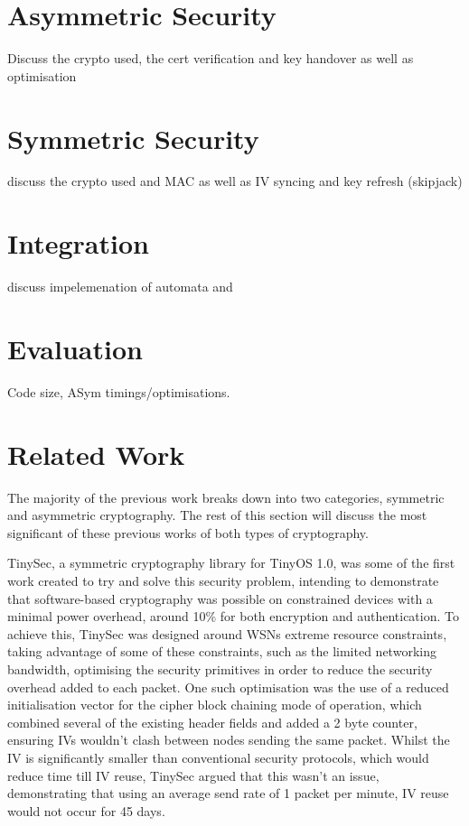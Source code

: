 \documentclass[conference]{./sty/IEEEtran}
\begin{document}
\section{Asymmetric Security} %
\label{sec:asymmetric_security}
Discuss the crypto used, the cert verification and key handover as well as optimisation

\section{Symmetric Security} %
\label{sec:symmetric_security}
discuss the crypto used and MAC
as well as IV syncing and key refresh (skipjack)
\section{Integration} %
\label{sec:integration}
discuss impelemenation of automata and 

\section{Evaluation} %
\label{sec:evaluation}
Code size, ASym timings/optimisations.

\section{Related Work} %
\label{sec:related_work}
The majority of the previous work breaks down into two categories, symmetric and asymmetric cryptography. The rest of this section will discuss the most significant of these previous works of both types of cryptography.

TinySec\cite{TinySec}, a symmetric cryptography library for TinyOS 1.0, was some of the first work created to try and solve this security problem, intending to demonstrate that software-based cryptography was possible on constrained devices with a minimal power overhead, around 10\% for both encryption and authentication. To achieve this, TinySec was designed around WSNs extreme resource constraints, taking advantage of some of these constraints, such as the limited networking bandwidth, optimising the security primitives in order to reduce the security overhead added to each packet. One such optimisation was the use of a reduced initialisation vector for the cipher block chaining mode of operation, which combined several of the existing header fields and added a 2 byte counter, ensuring IVs wouldn't clash between nodes sending the same packet. Whilst the IV is significantly smaller than conventional security protocols, which would reduce time till IV reuse, TinySec argued that this wasn't an issue, demonstrating that using an average send rate of 1 packet per minute, IV reuse would not occur for 45 days.
\end{document}
